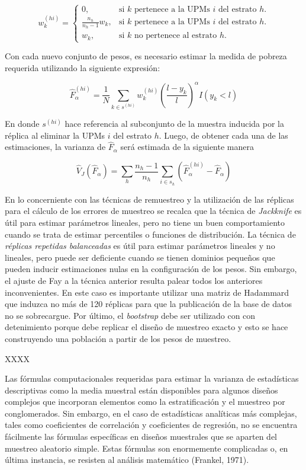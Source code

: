 \documentclass[
  12pt,
  spanish,
]{book}
\begin{document}
\[
w_{k}^{(hi)} = 
\begin{cases}
0, & \text{si $k$ pertenece a la UPMs $i$ del estrato $h$.} \\
\frac{n_h}{n_h-1}w_k, & \text{si $k$ pertenece a la UPMs $i$ del estrato $h$.} \\
w_k, & \text{si $k$ no pertenece al estrato $h$.} 
\end{cases}
\]

Con cada nuevo conjunto de pesos, es necesario estimar la medida de pobreza requerida utilizando la siguiente expresión:

\[
\hat{F}_{\alpha}^{(hi)}=\frac{1}{N}\sum_{k\in s^{(hi)}} w_k^{(hi)} 
\left(\frac{l-y_k}{l}\right)^{\alpha}I(y_k<l)
\]

En donde \(s^{(hi)}\) hace referencia al subconjunto de la muestra inducida por la réplica al eliminar la UPMs \(i\) del estrato \(h\). Luego, de obtener cada una de las estimaciones, la varianza de \(\hat{F}_{\alpha}\) será estimada de la siguiente manera

\[
\hat{V}_{J}(\hat{F}_{\alpha})=\sum_{h}\frac{n_h-1}{n_h}
\sum_{i\in s_h} \left(\hat{F}_{\alpha}^{(hi)} - \hat{F}_{\alpha}\right)
\]

En lo concerniente con las técnicas de remuestreo y la utilización de las réplicas para el cálculo de los errores de muestreo se recalca que la técnica de \emph{Jackknife} es útil para estimar parámetros lineales, pero no tiene un buen comportamiento cuando se trata de estimar percentiles o funciones de distribución. La técnica de \emph{réplicas repetidas balanceadas} es útil para estimar parámetros lineales y no lineales, pero puede ser deficiente cuando se tienen dominios pequeños que pueden inducir estimaciones nulas en la configuración de los pesos. Sin embargo, el ajuste de Fay a la técnica anterior resulta palear todos los anteriores inconvenientes. En este caso es importante utilizar una matriz de Hadammard que induzca no más de 120 réplicas para que la publicación de la base de datos no se sobrecargue. Por último, el \emph{bootstrap} debe ser utilizado con con detenimiento porque debe replicar el diseño de muestreo exacto y esto se hace construyendo una población a partir de los pesos de muestreo.

XXXX

Las fórmulas computacionales requeridas para estimar la varianza de estadísticas descriptivas como la media muestral están disponibles para algunos diseños complejos que incorporan elementos como la estratificación y el muestreo por conglomerados. Sin embargo, en el caso de estadísticas analíticas más complejas, tales como coeficientes de correlación y coeficientes de regresión, no se encuentra fácilmente las fórmulas específicas en diseños muestrales que se aparten del muestreo aleatorio simple. Estas fórmulas son enormemente complicadas o, en última instancia, se resisten al análisis matemático (Frankel, 1971).
\end{document}
